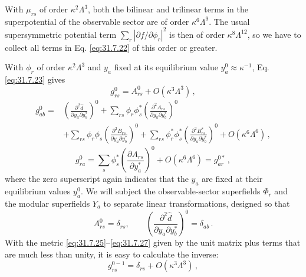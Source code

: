 With \(\mu_{rs}\) of order \(\kappa^2\Lambda^3\), both the bilinear and
trilinear terms in the superpotential of the observable sector are of order
\(\kappa^6\Lambda^9\). The usual supersymmetric potential term
\(\sum_r|\partial f/\partial\phi_r|^2\) is then of order
\(\kappa^8\Lambda^{12}\), so we have to collect all terms in
Eq. \eqref{eq:31.7.22} of this order or greater.

With \(\phi_r\) of order \(\kappa^2\Lambda^3\) and \(y_a\) fixed at its
equilibrium value \(y_a^0\approx\kappa^{-1}\), Eq. \eqref{eq:31.7.23}
gives
\begin{equation}
  g_{rs}^0=A_{rs}^0+O(\kappa^3\Lambda^3)\,,
  \tag{31.7.25}\label{eq:31.7.25}
\end{equation}
\begin{equation}
  \begin{aligned}
  g_{ab}^0={}&
  \left(\frac{\partial^2\widehat d}
    {\partial y_a\partial y_b^*}\right)^0
  +\sum_{rs}\phi_r\phi_s^*
    \left(\frac{\partial^2A_{rs}}
      {\partial y_a\partial y_b^*}\right)^0
  \\
  &+\sum_{rs}\phi_r\phi_s
    \left(\frac{\partial^2B_{rs}}
      {\partial y_a\partial y_b^*}\right)^0
  +\sum_{rs}\phi_r^*\phi_s^*
    \left(\frac{\partial^2B_{rs}^*}
      {\partial y_a\partial y_b^*}\right)^0
  +O(\kappa^6\Lambda^6)\,,
  \end{aligned}
  \tag{31.7.26}\label{eq:31.7.26}
\end{equation}
\begin{equation}
  g_{ra}^0
  =\sum_s\phi_s^*
    \left(\frac{\partial A_{rs}}{\partial y_a^*}\right)^0
   +O(\kappa^6\Lambda^6)
  =g_{ar}^{0*}\,,
  \tag{31.7.27}\label{eq:31.7.27}
\end{equation}
where the zero superscript again indicates that the \(y_a\) are fixed at
their equilibrium values \(y_a^0\). We will subject the observable-sector
superfields \(\Phi_r\) and the modular superfields \(Y_a\) to separate
linear transformations, designed so that
\begin{equation}
  A_{rs}^0=\delta_{rs},\qquad
  \left(\frac{\partial^2\widehat d}
    {\partial y_a\partial y_b^*}\right)^0
  =\delta_{ab}\,.
  \tag{31.7.28}\label{eq:31.7.28}
\end{equation}
With the metric \eqref{eq:31.7.25}--\eqref{eq:31.7.27} given by the unit
matrix plus terms that are much less than unity, it is easy to calculate
the inverse:
\begin{equation}
  g_{rs}^{0-1}=\delta_{rs}+O(\kappa^3\Lambda^3)\,,
  \tag{31.7.29}\label{eq:31.7.29}
\end{equation}
